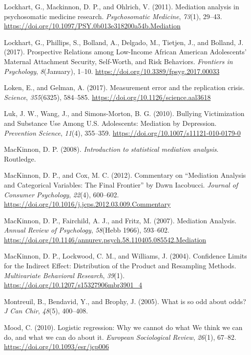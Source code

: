 \documentclass[]{DissertateUSU}
\begin{document}
\hypertarget{ref-Lockhart2011}{}
Lockhart, G., Mackinnon, D. P., and Ohlrich, V. (2011). Mediation
analysis in psychosomatic medicine research. \emph{Psychosomatic
Medicine}, \emph{73}(1), 29--43.
\url{https://doi.org/10.1097/PSY.0b013e318200a54b.Mediation}

\hypertarget{ref-Lockhart2017}{}
Lockhart, G., Phillips, S., Bolland, A., Delgado, M., Tietjen, J., and
Bolland, J. (2017). Prospective Relations among Low-Income African
American Adolescents' Maternal Attachment Security, Self-Worth, and Risk
Behaviors. \emph{Frontiers in Psychology}, \emph{8}(January), 1--10.
\url{https://doi.org/10.3389/fpsyg.2017.00033}

\hypertarget{ref-Loken2017}{}
Loken, E., and Gelman, A. (2017). Measurement error and the replication
crisis. \emph{Science}, \emph{355}(6325), 584--585.
\url{https://doi.org/10.1126/science.aal3618}

\hypertarget{ref-Luk2010}{}
Luk, J. W., Wang, J., and Simons-Morton, B. G. (2010). Bullying
Victimization and Substance Use Among U.S. Adolescents: Mediation by
Depression. \emph{Prevention Science}, \emph{11}(4), 355--359.
\url{https://doi.org/10.1007/s11121-010-0179-0}

\hypertarget{ref-mackinnon2008intro}{}
MacKinnon, D. P. (2008). \emph{Introduction to statistical mediation
analysis}. Routledge.

\hypertarget{ref-MacKinnon2012}{}
MacKinnon, D. P., and Cox, M. C. (2012). Commentary on ``Mediation
Analysis and Categorical Variables: The Final Frontier'' by Dawn
Iacobucci. \emph{Journal of Consumer Psychology}, \emph{22}(4),
600--602. \url{https://doi.org/10.1016/j.jcps.2012.03.009.Commentary}

\hypertarget{ref-MacKinnon2007}{}
MacKinnon, D. P., Fairchild, A. J., and Fritz, M. (2007). Mediation
Analysis. \emph{Annual Review of Psychology}, \emph{58}(Hebb 1966),
593--602.
\url{https://doi.org/10.1146/annurev.psych.58.110405.085542.Mediation}

\hypertarget{ref-MacKinnon2004}{}
MacKinnon, D. P., Lockwood, C. M., and Williams, J. (2004). Confidence
Limits for the Indirect Effect: Distribution of the Product and
Resampling Methods. \emph{Multivariate Behavioral Research},
\emph{39}(1). \url{https://doi.org/10.1207/s15327906mbr3901_4}

\hypertarget{ref-Montreuil2005}{}
Montreuil, B., Bendavid, Y., and Brophy, J. (2005). What is so odd about
odds? \emph{J Can Chir}, \emph{48}(5), 400--408.

\hypertarget{ref-Mood2010}{}
Mood, C. (2010). Logistic regression: Why we cannot do what We think we
can do, and what we can do about it. \emph{European Sociological
Review}, \emph{26}(1), 67--82. \url{https://doi.org/10.1093/esr/jcp006}
\end{document}

